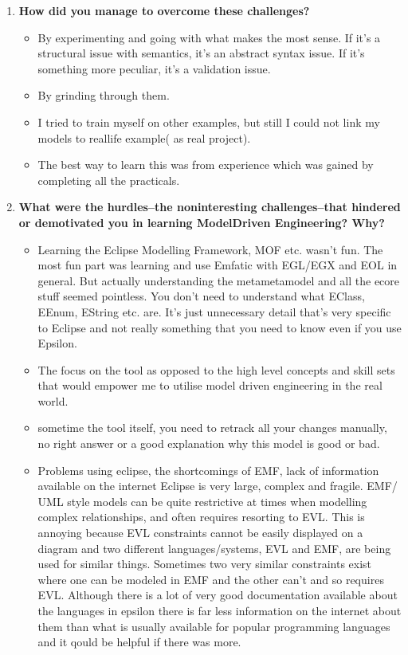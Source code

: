 \documentclass[12pt, a4paper]{report}
\begin{document}
\begin{appendices}
\begin{enumerate}
\item  \textbf{How did you manage to overcome these challenges?}
\begin{itemize}
\item By experimenting and going with what makes the most sense. If it's a structural issue with semantics, it's an abstract syntax issue. If it's something more peculiar, it's a validation issue.
\item By grinding through them.
\item I tried to train myself on other examples, but still I could not link my models to real­life example( as real project). 
\item The best way to learn this was from experience which was gained by completing all the practicals.
\end{itemize}


\item  \textbf{ What were the hurdles--the non­interesting challenges--that hindered or demotivated you in learning Model­Driven Engineering? Why?}
\begin{itemize}
\item Learning the Eclipse Modelling Framework, MOF etc. wasn't fun. The most fun part was learning and use Emfatic with EGL/EGX and EOL in general. But actually understanding the meta­metamodel and all the ecore stuff seemed pointless. You don't need to understand what EClass, EEnum, EString etc. are. It's just unnecessary detail that's very specific to
Eclipse and not really something that you need to know even if you use Epsilon.
\item The focus on the tool as opposed to the high level concepts and skill sets that would empower me to utilise model driven engineering in the real world.
\item sometime the tool itself, you need to re­track all your changes manually, no right answer or a good explanation why this model is good or bad.
\item Problems using eclipse, the shortcomings of EMF, lack of information available on the internet Eclipse is very large, complex and fragile. EMF/ UML ­style models can be quite restrictive at times when modelling complex relationships, and often requires resorting to EVL. This is annoying because EVL constraints cannot be easily displayed on a diagram and two different languages/systems, EVL and EMF, are being used for similar things. Sometimes two very similar constraints exist where one can be modeled in EMF and the
other can't and so requires EVL. Although there is a lot of very good documentation available about the languages in epsilon there is far less information on the internet about them than what is usually available for popular programming languages and it qould be helpful if there was more.
\end{itemize}


\end{enumerate}
\end{appendices}
\end{document}
